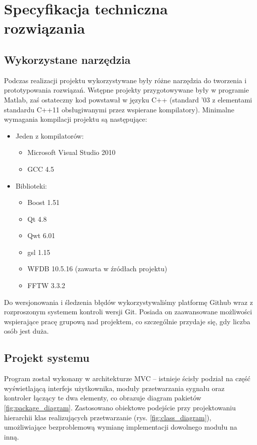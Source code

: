 \documentclass[a4paper, 11pt]{article}
\begin{document}
\section{Specyfikacja techniczna rozwiązania}
\label{sec:techspec}

\subsection{Wykorzystane narzędzia}
\label{sec:tools}

Podczas realizacji projektu wykorzystywane były różne narzędzia do tworzenia i prototypowania rozwiązań. Wstępne projekty przygotowywane były w programie Matlab, zaś ostateczny kod powstawał w języku C++ (standard '03 z elementami standardu C++11 obsługiwanymi przez wspierane kompilatory).
Minimalne wymagania kompilacji projektu są następujące:
\begin{itemize}
  \item Jeden z kompilatorów:
  \begin{itemize}
    \item Microsoft Visual Studio 2010
    \item GCC 4.5
  \end{itemize}
  \item Biblioteki:
  \begin{itemize}
    \item Boost 1.51
    \item Qt 4.8
    \item Qwt 6.01
    \item gsl 1.15
    \item WFDB 10.5.16 (zawarta w źródłach projektu)
    \item FFTW 3.3.2
  \end{itemize}
\end{itemize}

Do wersjonowania i śledzenia błędów wykorzystywaliśmy platformę Github wraz z rozproszonym systemem kontroli wersji Git. Posiada on zaawansowane możliwości wspierające pracę grupową nad projektem, co szczególnie przydaje się, gdy liczba osób jest duża.

\subsection{Projekt systemu}
\label{sec:sys_proj}

Program został wykonany w architekturze MVC -- istnieje ścisły podział na część wyświetlającą interfejs użytkownika, moduły przetwarzania sygnału oraz kontroler łączący te dwa elementy, co obrazuje diagram pakietów \ref{fig:package_diagram}. Zastosowano obiektowe podejście przy projektowaniu hierarchii klas realizujących przetwarzanie (rys. \ref{fig:class_diagram}), umożliwiające bezproblemową wymianę implementacji dowolnego modułu na inną.
\end{document}
